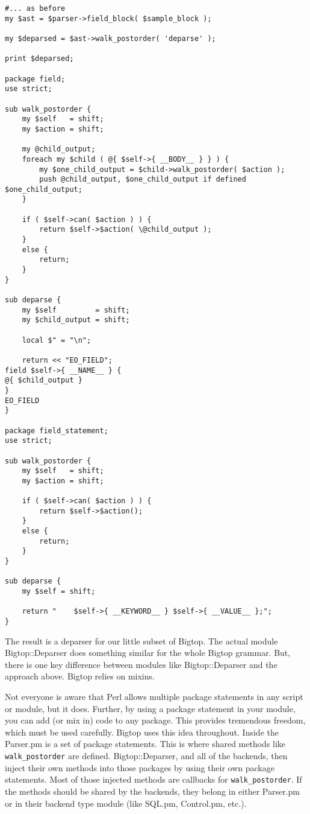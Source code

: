 \begin{verbatim}
#... as before
my $ast = $parser->field_block( $sample_block );

my $deparsed = $ast->walk_postorder( 'deparse' );

print $deparsed;

package field;
use strict;

sub walk_postorder {
    my $self   = shift;
    my $action = shift;

    my @child_output;
    foreach my $child ( @{ $self->{ __BODY__ } } ) {
        my $one_child_output = $child->walk_postorder( $action );
        push @child_output, $one_child_output if defined $one_child_output;
    }

    if ( $self->can( $action ) ) {
        return $self->$action( \@child_output );
    }
    else {
        return;
    }
}

sub deparse {
    my $self         = shift;
    my $child_output = shift;

    local $" = "\n";

    return << "EO_FIELD";
field $self->{ __NAME__ } {
@{ $child_output }
}
EO_FIELD
}

package field_statement;
use strict;

sub walk_postorder {
    my $self   = shift;
    my $action = shift;

    if ( $self->can( $action ) ) {
        return $self->$action();
    }
    else {
        return;
    }
}

sub deparse {
    my $self = shift;

    return "    $self->{ __KEYWORD__ } $self->{ __VALUE__ };";
}
\end{verbatim}

The result is a deparser for our little subset of Bigtop.  The actual
module Bigtop::Deparser does something similar for the whole Bigtop
grammar.  But, there is one key difference between modules like
Bigtop::Deparser and the approach above.  Bigtop relies on mixins.

Not everyone is aware that Perl allows multiple package statements in any
script or module, but it does.  Further, by using a package statement in your
module, you can add (or mix in) code to any package.  This provides tremendous
freedom, which must be used carefully.  Bigtop uses this idea throughout.
Inside the Parser.pm is a set of package statements.  This is where
shared methods like \verb+walk_postorder+ are defined.  Bigtop::Deparser,
and all of the backends, then inject their own methods into those packages
by using their own package statements.  Most of those injected methods
are callbacks for \verb+walk_postorder+.  If the methods should be shared
by the backends, they belong in either Parser.pm or in their backend type
module (like SQL.pm, Control.pm, etc.).

